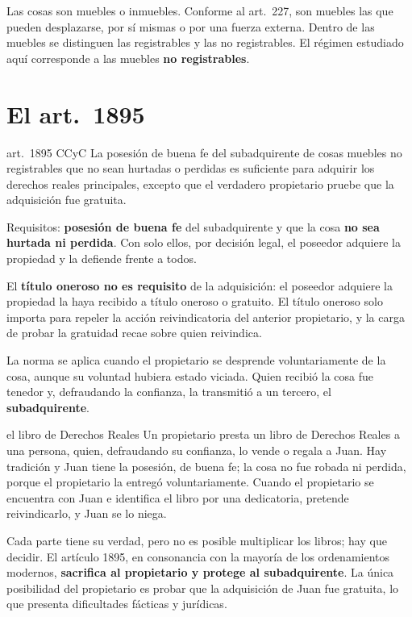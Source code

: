 \documentclass[12pt,oneside]{book}
\begin{document}
Las cosas son muebles o inmuebles. Conforme al art.~227, son muebles las que pueden desplazarse, por sí mismas o por una fuerza externa. Dentro de las muebles se distinguen las registrables y las no registrables. El régimen estudiado aquí corresponde a las muebles \textbf{no registrables}.

\section{El art.~1895}

\begin{regla}{art.~1895 CCyC}
La posesión de buena fe del subadquirente de cosas muebles no registrables que no sean hurtadas o perdidas es suficiente para adquirir los derechos reales principales, excepto que el verdadero propietario pruebe que la adquisición fue gratuita.
\end{regla}

Requisitos: \textbf{posesión de buena fe} del subadquirente y que la cosa \textbf{no sea hurtada ni perdida}. Con solo ellos, por decisión legal, el poseedor adquiere la propiedad y la defiende frente a todos.

\begin{importante}
El \textbf{título oneroso no es requisito} de la adquisición: el poseedor adquiere la propiedad la haya recibido a título oneroso o gratuito. El título oneroso solo importa para repeler la acción reivindicatoria del anterior propietario, y la carga de probar la gratuidad recae sobre quien reivindica.
\end{importante}

La norma se aplica cuando el propietario se desprende voluntariamente de la cosa, aunque su voluntad hubiera estado viciada. Quien recibió la cosa fue tenedor y, defraudando la confianza, la transmitió a un tercero, el \textbf{subadquirente}.

\begin{ejemplo}{el libro de Derechos Reales}
Un propietario presta un libro de Derechos Reales a una persona, quien, defraudando su confianza, lo vende o regala a Juan. Hay tradición y Juan tiene la posesión, de buena fe; la cosa no fue robada ni perdida, porque el propietario la entregó voluntariamente. Cuando el propietario se encuentra con Juan e identifica el libro por una dedicatoria, pretende reivindicarlo, y Juan se lo niega.

Cada parte tiene su verdad, pero no es posible multiplicar los libros; hay que decidir. El artículo 1895, en consonancia con la mayoría de los ordenamientos modernos, \textbf{sacrifica al propietario y protege al subadquirente}. La única posibilidad del propietario es probar que la adquisición de Juan fue gratuita, lo que presenta dificultades fácticas y jurídicas.
\end{ejemplo}
\end{document}
